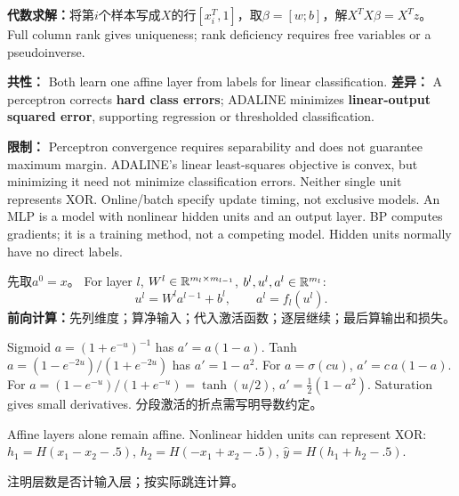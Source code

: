 
\textbf{代数求解：}将第$i$个样本写成$X$的行$[x_i^T,1]$，取$\beta=[w;b]$，解$X^TX\beta=X^Tz$。 Full column rank gives uniqueness; rank deficiency requires free variables or a pseudoinverse.

\textbf{共性：} Both learn one affine layer from labels for linear classification. \textbf{差异：} A perceptron corrects \textbf{hard class errors}; ADALINE minimizes \textbf{linear-output squared error}, supporting regression or thresholded classification.

\textbf{限制：} Perceptron convergence requires separability and does not guarantee maximum margin. ADALINE's linear least-squares objective is convex, but minimizing it need not minimize classification errors. Neither single unit represents XOR. Online/batch specify update timing, not exclusive models.
An MLP is a model with nonlinear hidden units and an output layer. BP computes gradients; it is a training method, not a competing model. Hidden units normally have no direct labels.

先取$a^0=x$。 For layer $l$, $W^l\in\mathbb{R}^{m_l\times m_{l-1}}$, $b^l,u^l,a^l\in\mathbb{R}^{m_l}$:
\[u^l=W^la^{l-1}+b^l,\qquad a^l=f_l(u^l).\]
\textbf{前向计算：}先列维度；算净输入；代入激活函数；逐层继续；最后算输出和损失。

Sigmoid $a=(1+e^{-u})^{-1}$ has $a'=a(1-a)$. Tanh $a=(1-e^{-2u})/(1+e^{-2u})$ has $a'=1-a^2$.
For $a=\sigma(cu)$, $a'=c\,a(1-a)$. For $a=(1-e^{-u})/(1+e^{-u})=\tanh(u/2)$, $a'=\frac12(1-a^2)$. Saturation gives small derivatives. 分段激活的折点需写明导数约定。

Affine layers alone remain affine. Nonlinear hidden units can represent XOR:
$h_1=H(x_1-x_2-.5)$, $h_2=H(-x_1+x_2-.5)$, $\hat y=H(h_1+h_2-.5)$.

注明层数是否计输入层；按实际跳连计算。
\columnend\sepcol
\columnstart
{}

